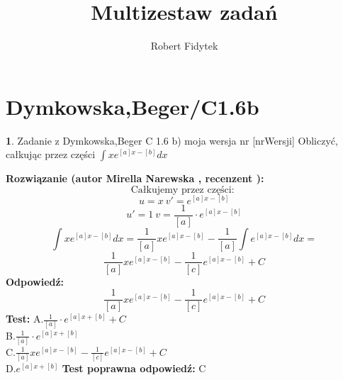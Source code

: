 \documentclass[12pt, a4paper]{article}
\title{Multizestaw zadań}
\author{Robert Fidytek}
\date{}
\theoremstyle{definition} %
\newtheorem{zad}{}
\newcommand{\kategoria}[1]{\section{#1}} %
\newcommand{\zadStart}[1]{\begin{zad}#1\newline} %
\newcommand{\zadStop}{\end{zad}}   %
\newcommand{\rozwStart}[2]{\noindent \textbf{Rozwiązanie (autor #1 , recenzent #2): }\newline} %
\newcommand{\odpStart}{\noindent \textbf{Odpowiedź:}\newline}    %
\newcommand{\odpStop}{\newline}                                             %
\newcommand{\testStart}{\noindent \textbf{Test:}\newline} %
\newcommand{\testStop}{\newline} %
\newcommand{\kluczStart}{\noindent \textbf{Test poprawna odpowiedź:}\newline} %
\newcommand{\kluczStop}{\newline} %
\begin{document}
\maketitle



\kategoria{Dymkowska,Beger/C1.6b}
\zadStart{Zadanie z Dymkowska,Beger C 1.6 b) moja wersja nr [nrWersji]}
Obliczyć, całkując przez części $\displaystyle \int xe^{[a]x-[b]}dx$
\zadStop
\rozwStart{Mirella Narewska}{}
$$\text{Całkujemy przez części: }$$
$$u=x \ v'=e^{[a]x-[b]}$$
$$u'=1 \ v=\frac{1}{[a]}\cdot e^{[a]x-[b]}$$
$$\displaystyle \int xe^{[a]x-[b]}dx=\displaystyle \frac{1}{[a]}xe^{[a]x-[b]} - \frac{1}{[a]}\int e^{[a]x-[b]}dx= $$
$$\displaystyle \frac{1}{[a]}xe^{[a]x-[b]} -\frac{1}{[c]}e^{[a]x-[b]} + C$$
\odpStart
$$\frac{1}{[a]}xe^{[a]x-[b]} -\frac{1}{[c]}e^{[a]x-[b]} + C$$
\odpStop
\testStart
A.$\frac{1}{[a]}\cdot e^{[a]x+[b]}+C$
\\
B.$\frac{1}{[a]}\cdot e^{[a]x+[b]}$
\\
C.$\frac{1}{[a]}xe^{[a]x-[b]} -\frac{1}{[c]}e^{[a]x-[b]} + C$
\\
D.$e^{[a]x+[b]}$
\testStop
\kluczStart
C
\kluczStop
\end{document}
